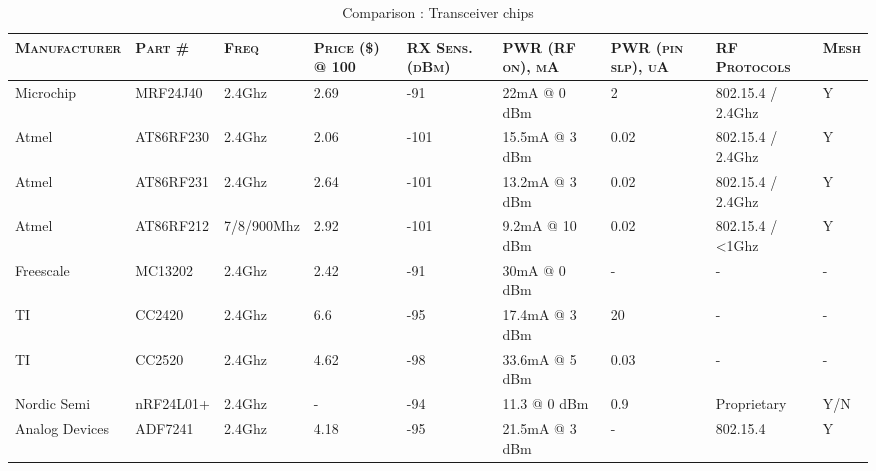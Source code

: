    \begin{sidewaystable}[h]
     \centering
     \begin{tabularx}{1\textwidth}{l l l p{1.5cm} p{1.5cm} l p{2.5cm} l l}
        \textsc{Manufacturer}
        & \textsc{Part \#}
        & \textsc{Freq}
        & \textsc{Price (\$) @ 100}
        & \textsc{RX Sens. (dBm)}
        & \textsc{PWR (RF on), mA}
        & \textsc{PWR (pin slp), uA}
        & \textsc{RF Protocols}
        & \textsc{Mesh }
        \\ \hline
        Microchip      & MRF24J40  & 2.4Ghz     & 2.69            & -91            & 22mA @ 0 dBm      & 2                 & 802.15.4 / 2.4Ghz & Y    \\ 
        Atmel          & AT86RF230 & 2.4Ghz     & 2.06            & -101           & 15.5mA @ 3 dBm    & 0.02              & 802.15.4 / 2.4Ghz & Y    \\ 
        Atmel          & AT86RF231 & 2.4Ghz     & 2.64            & -101           & 13.2mA @ 3 dBm    & 0.02              & 802.15.4 / 2.4Ghz & Y    \\ 
        Atmel          & AT86RF212 & 7/8/900Mhz & 2.92            & -101           & 9.2mA @ 10 dBm    & 0.02              & 802.15.4 / <1Ghz  & Y    \\ 
        Freescale      & MC13202   & 2.4Ghz     & 2.42            & -91            & 30mA @ 0 dBm      & -                 & -                 & -    \\ 
        TI             & CC2420    & 2.4Ghz     & 6.6             & -95            & 17.4mA @ 3 dBm    & 20                & -                 & -    \\ 
        TI             & CC2520    & 2.4Ghz     & 4.62            & -98            & 33.6mA @ 5 dBm    & 0.03              & -                 & -    \\ 
        Nordic Semi    & nRF24L01+ & 2.4Ghz     & -               & -94            & 11.3 @ 0 dBm      & 0.9               & Proprietary       & Y/N  \\ 
        Analog Devices & ADF7241   & 2.4Ghz     & 4.18            & -95            & 21.5mA @ 3 dBm    & -                 & 802.15.4          & Y    \\ 
     \end{tabularx}
     \caption{Comparison : Transceiver chips}
     \label{tab:transceiver-comparison}
   \end{sidewaystable}




